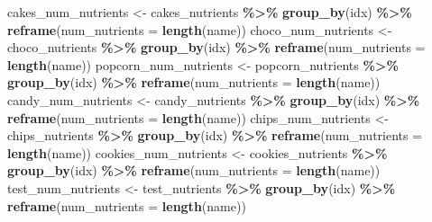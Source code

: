 \documentclass[
]{article}
\newenvironment{Shaded}{\begin{snugshade}}{\end{snugshade}}
\newcommand{\AttributeTok}[1]{\textcolor[rgb]{0.13,0.29,0.53}{#1}}
\newcommand{\ControlFlowTok}[1]{\textcolor[rgb]{0.13,0.29,0.53}{\textbf{#1}}}
\newcommand{\FunctionTok}[1]{\textcolor[rgb]{0.13,0.29,0.53}{\textbf{#1}}}
\newcommand{\NormalTok}[1]{#1}
\newcommand{\OtherTok}[1]{\textcolor[rgb]{0.56,0.35,0.01}{#1}}
\newcommand{\SpecialCharTok}[1]{\textcolor[rgb]{0.81,0.36,0.00}{\textbf{#1}}}
\begin{document}
\begin{Shaded}
\begin{Highlighting}[]
\NormalTok{cakes\_num\_nutrients }\OtherTok{\textless{}{-}}\NormalTok{ cakes\_nutrients }\SpecialCharTok{\%\textgreater{}\%} \FunctionTok{group\_by}\NormalTok{(idx) }\SpecialCharTok{\%\textgreater{}\%} \FunctionTok{reframe}\NormalTok{(}\AttributeTok{num\_nutrients =} \FunctionTok{length}\NormalTok{(name))}
\NormalTok{choco\_num\_nutrients }\OtherTok{\textless{}{-}}\NormalTok{ choco\_nutrients }\SpecialCharTok{\%\textgreater{}\%} \FunctionTok{group\_by}\NormalTok{(idx) }\SpecialCharTok{\%\textgreater{}\%} \FunctionTok{reframe}\NormalTok{(}\AttributeTok{num\_nutrients =} \FunctionTok{length}\NormalTok{(name))}
\NormalTok{popcorn\_num\_nutrients }\OtherTok{\textless{}{-}}\NormalTok{ popcorn\_nutrients }\SpecialCharTok{\%\textgreater{}\%} \FunctionTok{group\_by}\NormalTok{(idx) }\SpecialCharTok{\%\textgreater{}\%} \FunctionTok{reframe}\NormalTok{(}\AttributeTok{num\_nutrients =} \FunctionTok{length}\NormalTok{(name))}
\NormalTok{candy\_num\_nutrients }\OtherTok{\textless{}{-}}\NormalTok{ candy\_nutrients }\SpecialCharTok{\%\textgreater{}\%} \FunctionTok{group\_by}\NormalTok{(idx) }\SpecialCharTok{\%\textgreater{}\%} \FunctionTok{reframe}\NormalTok{(}\AttributeTok{num\_nutrients =} \FunctionTok{length}\NormalTok{(name))}
\NormalTok{chips\_num\_nutrients }\OtherTok{\textless{}{-}}\NormalTok{ chips\_nutrients }\SpecialCharTok{\%\textgreater{}\%} \FunctionTok{group\_by}\NormalTok{(idx) }\SpecialCharTok{\%\textgreater{}\%} \FunctionTok{reframe}\NormalTok{(}\AttributeTok{num\_nutrients =} \FunctionTok{length}\NormalTok{(name))}
\NormalTok{cookies\_num\_nutrients }\OtherTok{\textless{}{-}}\NormalTok{ cookies\_nutrients }\SpecialCharTok{\%\textgreater{}\%} \FunctionTok{group\_by}\NormalTok{(idx) }\SpecialCharTok{\%\textgreater{}\%} \FunctionTok{reframe}\NormalTok{(}\AttributeTok{num\_nutrients =} \FunctionTok{length}\NormalTok{(name))}
\NormalTok{test\_num\_nutrients }\OtherTok{\textless{}{-}}\NormalTok{ test\_nutrients }\SpecialCharTok{\%\textgreater{}\%} \FunctionTok{group\_by}\NormalTok{(idx) }\SpecialCharTok{\%\textgreater{}\%} \FunctionTok{reframe}\NormalTok{(}\AttributeTok{num\_nutrients =} \FunctionTok{length}\NormalTok{(name))}
\end{Highlighting}
\end{Shaded}

\begin{Shaded}
\end{Shaded}
\end{document}
